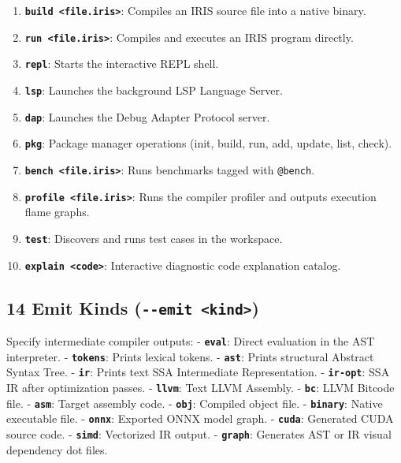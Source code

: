 \documentclass[
  english,
]{book}
\providecommand{\tightlist}{%
  \setlength{\itemsep}{0pt}\setlength{\parskip}{0pt}}
\begin{document}
\begin{enumerate}
\def\labelenumi{\arabic{enumi}.}
\tightlist
\item
  \textbf{\texttt{build\ \textless{}file.iris\textgreater{}}}: Compiles
  an IRIS source file into a native binary.
\item
  \textbf{\texttt{run\ \textless{}file.iris\textgreater{}}}: Compiles
  and executes an IRIS program directly.
\item
  \textbf{\texttt{repl}}: Starts the interactive REPL shell.
\item
  \textbf{\texttt{lsp}}: Launches the background LSP Language Server.
\item
  \textbf{\texttt{dap}}: Launches the Debug Adapter Protocol server.
\item
  \textbf{\texttt{pkg}}: Package manager operations (init, build, run,
  add, update, list, check).
\item
  \textbf{\texttt{bench\ \textless{}file.iris\textgreater{}}}: Runs
  benchmarks tagged with \texttt{@bench}.
\item
  \textbf{\texttt{profile\ \textless{}file.iris\textgreater{}}}: Runs
  the compiler profiler and outputs execution flame graphs.
\item
  \textbf{\texttt{test}}: Discovers and runs test cases in the
  workspace.
\item
  \textbf{\texttt{explain\ \textless{}code\textgreater{}}}: Interactive
  diagnostic code explanation catalog.
\end{enumerate}

\subsection{\texorpdfstring{14 Emit Kinds
(\texttt{-\/-emit\ \textless{}kind\textgreater{}})}{14 Emit Kinds (-\/-emit \textless kind\textgreater)}}\label{emit-kinds---emit-kind}

Specify intermediate compiler outputs: - \textbf{\texttt{eval}}: Direct
evaluation in the AST interpreter. - \textbf{\texttt{tokens}}: Prints
lexical tokens. - \textbf{\texttt{ast}}: Prints structural Abstract
Syntax Tree. - \textbf{\texttt{ir}}: Prints text SSA Intermediate
Representation. - \textbf{\texttt{ir-opt}}: SSA IR after optimization
passes. - \textbf{\texttt{llvm}}: Text LLVM Assembly. -
\textbf{\texttt{bc}}: LLVM Bitcode file. - \textbf{\texttt{asm}}: Target
assembly code. - \textbf{\texttt{obj}}: Compiled object file. -
\textbf{\texttt{binary}}: Native executable file. -
\textbf{\texttt{onnx}}: Exported ONNX model graph. -
\textbf{\texttt{cuda}}: Generated CUDA source code. -
\textbf{\texttt{simd}}: Vectorized IR output. - \textbf{\texttt{graph}}:
Generates AST or IR visual dependency dot files.
\end{document}
